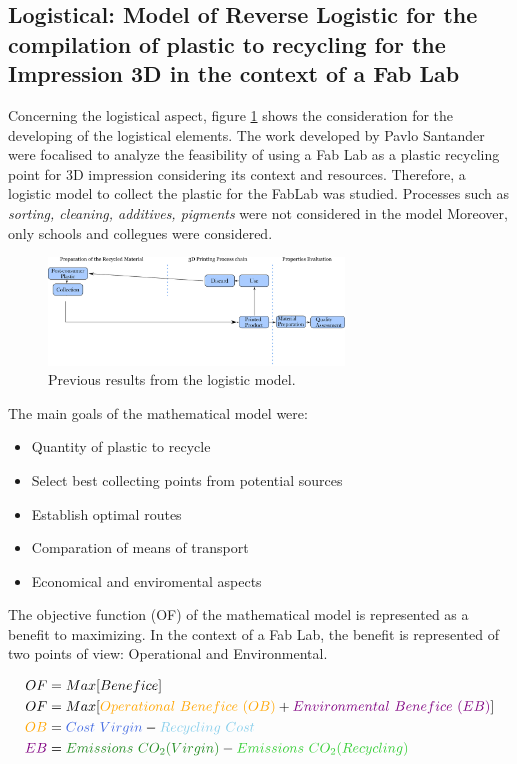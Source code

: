 \subsection{Logistical: Model of Reverse Logistic for the compilation of plastic to recycling for the Impression 3D in the context of a Fab Lab}

Concerning the logistical aspect, figure \ref{Context.Pavlo} shows the consideration for the developing of the logistical elements.
The work developed by Pavlo Santander were focalised to analyze the feasibility of using a Fab Lab as a plastic recycling point for 3D impression considering its context and resources.
Therefore, a logistic model to collect the plastic for the FabLab was studied.
Processes such as \textit{sorting, cleaning, additives, pigments} were not considered in the model
Moreover, only schools and collegues were considered. 

\begin{figure}[H]
	\centering
	\includegraphics[width=0.7\textwidth]{Figures/Pavlo/Context-Pavlo.pdf}
	\caption{Previous results from the logistic model.}
	\label{Context.Pavlo}		
\end{figure}



The main goals of the mathematical model were:


\begin{itemize}[noitemsep]
	\item Quantity of plastic to recycle
	\item Select best collecting points from potential sources
	\item Establish optimal routes
	\item Comparation of means of transport
	\item Economical and enviromental aspects
\end{itemize}

The objective function (OF) of the mathematical model is represented as a benefit to maximizing. 
In the context of a Fab Lab, the benefit is represented of two points of view: Operational and Environmental. 

\begin{align*} 
OF &= Max[Benefice] \\ 
OF &=  Max[\textcolor{Orange}{Operational~Benefice~(OB)} + \textcolor{Purple}{Environmental~Benefice~(EB) }]  \\
\textcolor{Orange}{OB} &=  \textcolor{RoyalBlue}{Cost~Virgin} - \textcolor{SkyBlue}{Recycling~Cost} \\
\textcolor{Purple}{EB} &= \textcolor{ForestGreen}{Emissions~CO_{2}(Virgin)} - \textcolor{LimeGreen}{Emissions~CO_{2}(Recycling)}
\end{align*}




